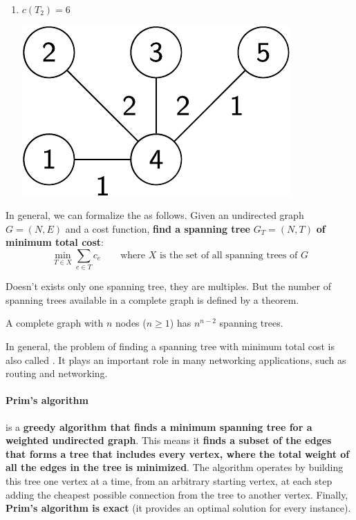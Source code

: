 \begin{examplebox}
\begin{enumerate}
        \item $c\left(T_{2}\right) = 6$
        \begin{center}
            \includegraphics[width=.3\textwidth]{img/trees-8.pdf}
        \end{center}
    \end{enumerate}
\end{examplebox}

\newpage

\noindent
In general, we can formalize the  as follows. Given an undirected graph $G = \left(N,E\right)$ and a cost function, \textbf{find a spanning tree} $G_{T} = \left(N, T\right)$ \textbf{of minimum total cost}:
\begin{equation}
    \underset{T \in X}{\min} \displaystyle\sum_{e \in T} c_{e} \hspace{2em} \text{where } X \text{ is the set of all spanning trees of } G
\end{equation}

\highspace
Doesn't exists only one spanning tree, they are multiples. But the number of spanning trees available in a complete graph is defined by a theorem.
\begin{theorem}[Cayley, 1889]
    A complete graph with $n$ nodes ($n \ge 1$) has $n^{n-2}$ spanning trees.
\end{theorem}

\noindent
In general, the problem of finding a spanning tree with minimum total cost is also called . It plays an important role in many networking applications, such as routing and networking.\cite{10.1007/978-3-642-38853-8_14}

\newpage

\paragraph{Prim's algorithm}\label{paragraph: Prim's algorithm}

\begin{definitionbox}[: Prim's]
     is a \textbf{greedy algorithm that finds a minimum spanning tree for a weighted undirected graph}. This means it \textbf{finds a subset of the edges that forms a tree that includes every vertex, where the total weight of all the edges in the tree is minimized}. The algorithm operates by building this tree one vertex at a time, from an arbitrary starting vertex, at each step adding the cheapest possible connection from the tree to another vertex. Finally, \textbf{Prim's algorithm is exact} (it provides an optimal solution for every instance).
\end{definitionbox}

